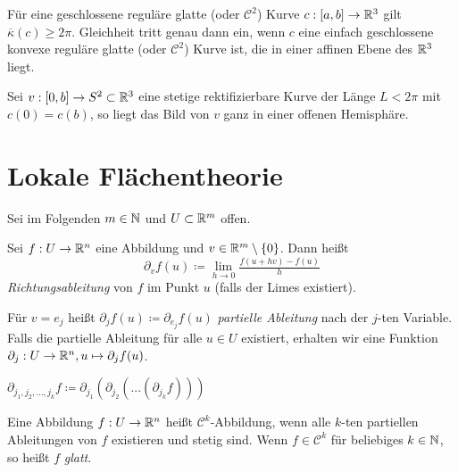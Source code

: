 \documentclass{cheat-sheet}
\begin{document}
\begin{satz}[Fenchel]
  Für eine geschlossene reguläre glatte (oder $\mathcal{C}^2$) Kurve $c : \left[ a, b \right] \to \mathbb{R}^3$ gilt $\overline\kappa(c) \geq 2 \pi$. Gleichheit tritt genau dann ein, wenn $c$ eine einfach geschlossene konvexe reguläre glatte (oder $\mathcal{C}^2$) Kurve ist, die in einer affinen Ebene des $\mathbb{R}^3$ liegt.
\end{satz}

\begin{samepage}

\begin{satz}
  Sei $v : \left[ 0, b \right] \to S^2 \subset \mathbb{R}^3$ eine stetige rektifizierbare Kurve der Länge $L < 2 \pi$
mit $c(0) = c(b)$, so liegt das Bild von $v$ ganz in einer offenen Hemisphäre.
\end{satz}


\section{Lokale Flächentheorie}


\end{samepage}

\begin{nota}
  Sei im Folgenden $m \in \mathbb{N}$ und $U \subset \mathbb{R}^m$ offen.
\end{nota}

\begin{defn}
  Sei $f : U \to \mathbb{R}^n$ eine Abbildung und $v \in \mathbb{R}^m \setminus \{ 0 \}$. Dann heißt
  \[ \partial_v f(u) \coloneqq \lim_{h \to 0} \tfrac{f(u + hv) - f(u)}{ h } \]
  \emph{Richtungsableitung} von $f$ im Punkt $u$ (falls der Limes existiert).
\end{defn}
\begin{defn}
  Für $v = e_j$ heißt $\partial_j f(u) \coloneqq \partial_{e_j} f(u)$ \emph{partielle Ableitung} nach der $j$-ten Variable. Falls die partielle Ableitung für alle $u \in U$ existiert, erhalten wir eine Funktion $\partial_j : U \to \mathbb{R}^n, u \mapsto \partial_j f(u)$.
\end{defn}

\begin{nota}
  $\partial_{j_1, j_2, ..., j_k} f \coloneqq \partial_{j_1} ( \partial_{j_2} ( ... ( \partial_{j_k} f) ) )$
\end{nota}

\begin{defn}
  Eine Abbildung $f : U \to \mathbb{R}^n$ heißt $\mathcal{C}^k$-Abbildung, wenn alle $k$-ten partiellen Ableitungen von $f$ existieren und stetig sind. Wenn $f \in \mathcal{C}^k$ für beliebiges $k \in \mathbb{N}$, so heißt $f$ \emph{glatt}.
\end{defn}
\end{document}
